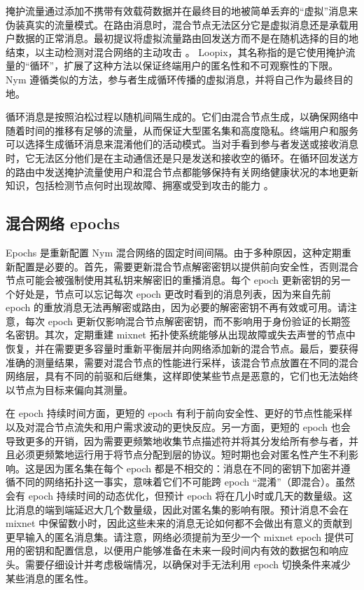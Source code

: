 \documentclass{article}
\begin{document}
	掩护流量通过添加不携带有效载荷数据并在最终目的地被简单丢弃的“虚拟”消息来伪装真实的流量模式。在路由消息时，混合节点无法区分它是虚拟消息还是承载用户数据的正常消息。最初提议将虚拟流量路由回发送方而不是在随机选择的目的地结束，以主动检测对混合网络的主动攻击 \cite{ref30}。 Loopix，其名称指的是它使用掩护流量的“循环”，扩展了这种方法以保证终端用户的匿名性和不可观察性的下限\cite{ref89}。Nym 遵循类似的方法，参与者生成循环传播的虚拟消息，并将自己作为最终目的地。\newline

	循环消息是按照泊松过程以随机间隔生成的。它们由混合节点生成，以确保网络中随着时间的推移有足够的流量，从而保证大型匿名集和高度隐私。终端用户和服务可以选择生成循环消息来混淆他们的活动模式。当对手看到参与者发送或接收消息时，它无法区分他们是在主动通信还是只是发送和接收空的循环。在循环回发送方的路由中发送掩护流量使用户和混合节点都能够保持有关网络健康状况的本地更新知识，包括检测节点何时出现故障、拥塞或受到攻击的能力 \cite{ref30}。\newline

	\subsection{混合网络 epochs}

	Epochs 是重新配置 Nym 混合网络的固定时间间隔。由于多种原因，这种定期重新配置是必要的。首先，需要更新混合节点解密密钥以提供前向安全性，否则混合节点可能会被强制使用其私钥来解密旧的重播消息。每个 epoch 更新密钥的另一个好处是，节点可以忘记每次 epoch 更改时看到的消息列表，因为来自先前 epoch 的重放消息无法再解密或路由，因为必要的解密密钥不再有效或可用。请注意，每次 epoch 更新仅影响混合节点解密密钥，而不影响用于身份验证的长期签名密钥。其次，定期重建 mixnet 拓扑使系统能够从出现故障或失去声誉的节点中恢复，并在需要更多容量时重新平衡层并向网络添加新的混合节点。最后，要获得准确的测量结果，需要对混合节点的性能进行采样，该混合节点放置在不同的混合网络层，具有不同的前驱和后继集，这样即使某些节点是恶意的，它们也无法始终以节点为目标来偏向其测量。\newline

	在 epoch 持续时间方面，更短的 epoch 有利于前向安全性、更好的节点性能采样以及对混合节点流失和用户需求波动的更快反应。另一方面，更短的 epoch 也会导致更多的开销，因为需要更频繁地收集节点描述符并将其分发给所有参与者，并且必须更频繁地运行用于将节点分配到层的协议。短时期也会对匿名性产生不利影响。这是因为匿名集在每个 epoch 都是不相交的：消息在不同的密钥下加密并遵循不同的网络拓扑这一事实，意味着它们不可能跨 epoch “混淆”（即混合）。虽然会有 epoch 持续时间的动态优化，但预计 epoch 将在几小时或几天的数量级。这比消息的端到端延迟大几个数量级，因此对匿名集的影响有限。预计消息不会在 mixnet 中保留数小时，因此这些未来的消息无论如何都不会做出有意义的贡献到更早输入的匿名消息集。请注意，网络必须提前为至少一个 mixnet epoch 提供可用的密钥和配置信息，以便用户能够准备在未来一段时间内有效的数据包和响应头。需要仔细设计并考虑极端情况，以确保对手无法利用 epoch 切换条件来减少某些消息的匿名性。\newline
\end{document}
